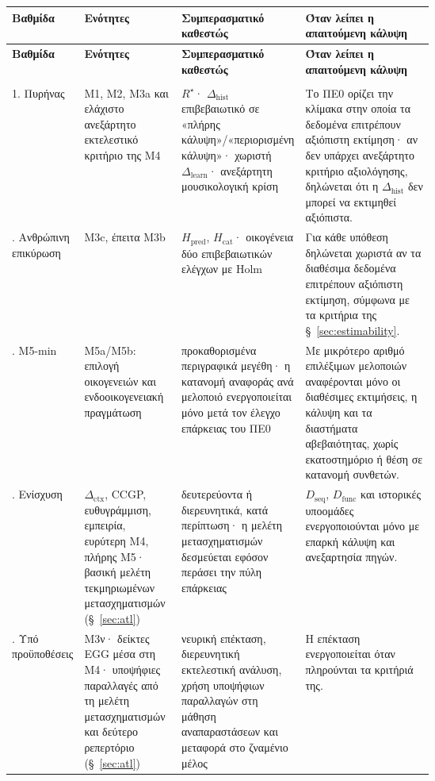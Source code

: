 \documentclass[11pt,a4paper]{article}
\begin{document}
{\footnotesize
\begin{xltabular}{\linewidth}{@{}>{\RaggedRight\arraybackslash}p{0.105\linewidth}>{\RaggedRight\arraybackslash}p{0.23\linewidth}>{\RaggedRight\arraybackslash}p{0.29\linewidth}Y@{}}
\toprule
\textbf{Βαθμίδα} & \textbf{Ενότητες} & \textbf{Συμπερασματικό καθεστώς} & \textbf{Όταν λείπει η απαιτούμενη κάλυψη}\tabularnewline
\midrule
\endfirsthead
\toprule
\textbf{Βαθμίδα} & \textbf{Ενότητες} & \textbf{Συμπερασματικό καθεστώς} & \textbf{Όταν λείπει η απαιτούμενη κάλυψη}\tabularnewline
\midrule
\endhead
\midrule
{}\tabularnewline
\endfoot
\bottomrule
\endlastfoot

1. Πυρήνας & M1, M2, M3a και ελάχιστο ανεξάρτητο εκτελεστικό κριτήριο της M4 & $R^\star$· $\Delta_{\mathrm{hist}}$ επιβεβαιωτικό σε «πλήρης κάλυψη»/«περιορισμένη κάλυψη»· χωριστή $\Delta_{\mathrm{learn}}$· ανεξάρτητη μουσικολογική κρίση & Το ΠΕ0 ορίζει την κλίμακα στην οποία τα δεδομένα επιτρέπουν αξιόπιστη εκτίμηση· αν δεν υπάρχει ανεξάρτητο κριτήριο αξιολόγησης, δηλώνεται ότι η $\Delta_{\mathrm{hist}}$ δεν μπορεί να εκτιμηθεί αξιόπιστα.. Ανθρώπινη επικύρωση & M3c, έπειτα M3b & $H_{\mathrm{pred}}$, $H_{\mathrm{cat}}$· οικογένεια δύο επιβεβαιωτικών ελέγχων με Holm & Για κάθε υπόθεση δηλώνεται χωριστά αν τα διαθέσιμα δεδομένα επιτρέπουν αξιόπιστη εκτίμηση, σύμφωνα με τα κριτήρια της §~\ref{sec:estimability}.. M5-min & M5a/M5b: επιλογή οικογενειών και ενδοοικογενειακή πραγμάτωση & προκαθορισμένα περιγραφικά μεγέθη· η κατανομή αναφοράς ανά μελοποιό ενεργοποιείται μόνο μετά τον έλεγχο επάρκειας του ΠΕ0 & Με μικρότερο αριθμό επιλέξιμων μελοποιών αναφέρονται μόνο οι διαθέσιμες εκτιμήσεις, η κάλυψη και τα διαστήματα αβεβαιότητας, χωρίς εκατοστημόριο ή θέση σε κατανομή συνθετών.. Ενίσχυση & $\Delta_{\mathrm{ctx}}$, CCGP, ευθυγράμμιση, εμπειρία, ευρύτερη M4, πλήρης M5· βασική μελέτη τεκμηριωμένων μετασχηματισμών (§~\ref{sec:atl}) & δευτερεύοντα ή διερευνητικά, κατά περίπτωση· η μελέτη μετασχηματισμών δεσμεύεται εφόσον περάσει την πύλη επάρκειας & $D_{\mathrm{seq}}$, $D_{\mathrm{func}}$ και ιστορικές υποομάδες ενεργοποιούνται μόνο με επαρκή κάλυψη και ανεξαρτησία πηγών.. Υπό προϋποθέσεις & M3ν· δείκτες EGG μέσα στη M4· υποψήφιες παραλλαγές από τη μελέτη μετασχηματισμών και δεύτερο ρεπερτόριο (§~\ref{sec:atl}) & νευρική επέκταση, διερευνητική εκτελεστική ανάλυση, χρήση υποψήφιων παραλλαγών στη μάθηση αναπαραστάσεων και μεταφορά στο ζναμένιο μέλος & Η επέκταση ενεργοποιείται όταν πληρούνται τα κριτήριά της.\tabularnewline
\end{xltabular}
}\par
\end{document}
